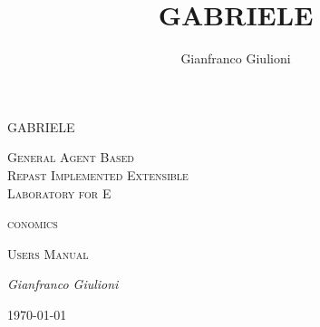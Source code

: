 \documentclass{book}
\title{GABRIELE}
\author{Gianfranco Giulioni}
\begin{document}
 
\begin{titlepage}

	\begin{center}
	{\color{blue}\scshape\Huge GABRIELE \par}
	\end{center}

	\vspace{2cm}

	\noindent
	{\color{blue}\scshape\Huge G}{\scshape\LARGE eneral} 
	{\color{blue}\scshape\Huge A}{\scshape\LARGE gent} 
	{\color{blue}\scshape\Huge B}{\scshape\LARGE ased}\\
	{\color{blue}\scshape\Huge R}{\scshape\LARGE epast} \hskip7mm 
	{\color{blue}\scshape\Huge I}{\scshape\LARGE mplemented}  
	{\color{blue}\scshape\Huge E}{\scshape\LARGE xtensible}\\
	{\color{blue}\scshape\Huge L}{\scshape\LARGE aboratory} \hskip2.5mm
	{\scshape\large for} \hskip2.5mm
	{\color{blue}\scshape\Huge E}{\scshape\LARGE conomics \par}



 
	
	\vspace{1.5cm}
	\noindent
	{\scshape\Huge Users Manual \par}

	\vspace{2cm}
	\noindent
	{\Large\itshape Gianfranco Giulioni\par}
	\vfill


	{\large \today\par}
\end{titlepage}
\end{document}
